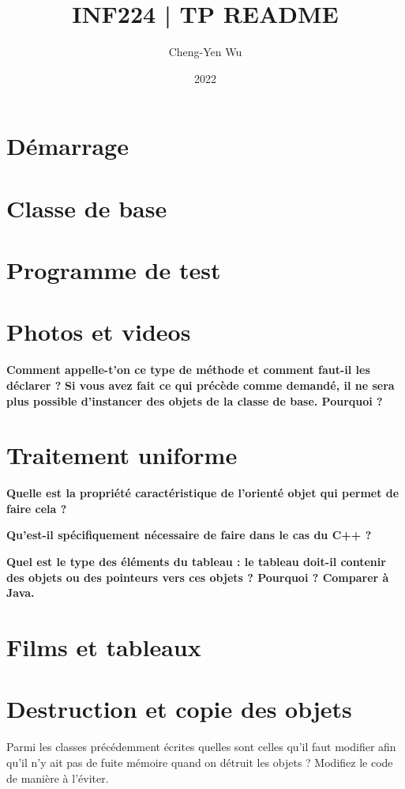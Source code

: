 \documentclass[a4paper]{article}
\title{\vspace{-2cm}INF224 | TP README}
\author{Cheng-Yen Wu}
\date{2022}
\begin{document}
\maketitle

\section{Démarrage}
\section{Classe de base}
\section{Programme de test}
\section{Photos et videos}

\textbf{Comment appelle-t'on ce type de méthode et comment faut-il les déclarer
?}
\textbf{ Si vous avez fait ce qui précède comme demandé, il ne sera plus
possible d'instancer des objets de la classe de base. Pourquoi ? }

\section{Traitement uniforme}

\textbf{Quelle est la propriété caractéristique de l'orienté objet qui permet de
faire cela ?}

\textbf{Qu'est-il spécifiquement nécessaire de faire dans le cas du C++ ?} 

\textbf{Quel est le type des éléments du tableau : le tableau doit-il contenir
des objets ou des pointeurs vers ces objets ? Pourquoi ?  Comparer à Java.} 

\section{Films et tableaux}
\section{Destruction et copie des objets}

Parmi les classes précédemment écrites quelles sont celles qu'il faut modifier
afin qu'il n'y ait pas de fuite mémoire quand on détruit les objets ? Modifiez
le code de manière à l'éviter.
\end{document}
